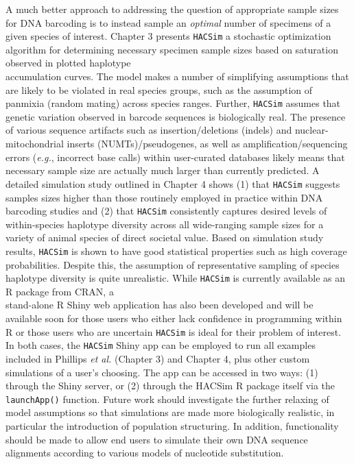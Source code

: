 A much better approach to addressing the question of appropriate sample sizes for DNA barcoding is to instead sample an \textit{optimal} number of specimens of a given species of interest. Chapter 3 presents {\tt HACSim} a stochastic optimization algorithm for determining necessary specimen sample sizes based on saturation observed in plotted haplotype \\ accumulation curves. The model makes a number of simplifying assumptions that are likely to be violated in real species groups, such as the assumption of panmixia (random mating) across species ranges. Further, {\tt HACSim} assumes that genetic variation observed in barcode sequences is biologically real. The presence of various sequence artifacts such as insertion/deletions (indels) and nuclear-mitochondrial inserts (NUMTs)/pseudogenes, as well as amplification/sequencing errors (\textit{e.g.}, incorrect base calls) within user-curated databases likely means that necessary sample size are actually much larger than currently predicted.  A detailed simulation study outlined in Chapter 4 shows (1) that {\tt HACSim} suggests samples sizes higher than those routinely employed in practice within DNA \\ barcoding studies and (2) that {\tt HACSim} consistently captures desired levels of \\ within-species haplotype diversity across all wide-ranging sample sizes for a variety of animal species of direct societal value. Based on simulation study results, {\tt HACSim} is shown to have good statistical properties such as high coverage probabilities. Despite this, the assumption of representative sampling of species haplotype diversity is quite unrealistic. While {\tt HACSim} is currently available as an R package from CRAN, a \\ stand-alone R Shiny web application has also been developed and will be available soon for those users who either lack confidence in programming within R or those users who are uncertain {\tt HACSim} is ideal for their problem of interest. In both cases, the {\tt HACSim} Shiny app can be employed to run all examples included in Phillips \textit{et al.} \cite{phillips2020hacsim} (Chapter 3) and Chapter 4, plus other custom simulations of a user's choosing. The app can be accessed in two ways: (1) through the Shiny server, or (2) through the HACSim R package itself via the {\tt launchApp()} function. Future work should investigate the further relaxing of model assumptions so that simulations are made more biologically realistic, in particular the introduction of population structuring. In addition, functionality should be made to allow end users to simulate their own DNA sequence alignments according to various models of nucleotide substitution.

